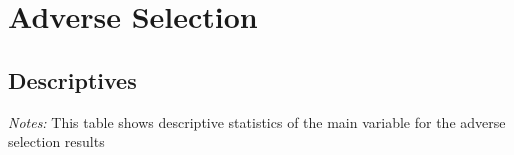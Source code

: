\documentclass[12pt]{article}
\begin{document}
\newpage
\clearpage

\section{Adverse Selection}

\subsection{Descriptives}

 \begin{table}[h!]
     \centering
     \caption{Descriptive Statistics \label{tab:_desc_adverse_main}}
     \resizebox{0.8\textwidth}{!}{
      
      }
      \begin{minipage}{\textwidth}
         {\small \textit{Notes: } This table shows descriptive statistics of the main variable for the adverse selection results }
     \end{minipage}
 \end{table}
 

%    
\end{document}
